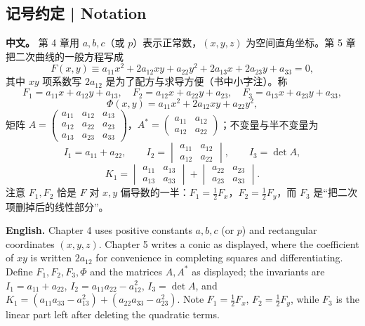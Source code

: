 \documentclass[UTF8,11pt,a4paper]{ctexart}
\newcommand{\APS}[2]{\par\noindent\textbf{中文。} #1\par\noindent\textbf{English.} #2\par\smallskip}
\theoremstyle{definition}
\begin{document}
\subsection*{记号约定 | Notation}
\APS{第 4 章用 $a,b,c$（或 $p$）表示正常数，$(x,y,z)$ 为空间直角坐标。第 5 章把二次曲线的一般方程写成
\[
F(x,y)\equiv a_{11}x^2+2a_{12}xy+a_{22}y^2+2a_{13}x+2a_{23}y+a_{33}=0,
\]
其中 $xy$ 项系数写 $2a_{12}$ 是为了配方与求导方便（书中小字注）。称
\[
F_1=a_{11}x+a_{12}y+a_{13},\quad F_2=a_{12}x+a_{22}y+a_{23},\quad F_3=a_{13}x+a_{23}y+a_{33},
\]
\[
\Phi(x,y)=a_{11}x^2+2a_{12}xy+a_{22}y^2,
\]
矩阵 $A=\begin{pmatrix}a_{11}&a_{12}&a_{13}\\ a_{12}&a_{22}&a_{23}\\ a_{13}&a_{23}&a_{33}\end{pmatrix}$，$A^*=\begin{pmatrix}a_{11}&a_{12}\\ a_{12}&a_{22}\end{pmatrix}$；不变量与半不变量为
\[
I_1=a_{11}+a_{22},\qquad I_2={\begin{vmatrix}a_{11}&a_{12}\\ a_{12}&a_{22}\end{vmatrix}},\qquad I_3=\det A,
\]
\[
K_1={\begin{vmatrix}a_{11}&a_{13}\\ a_{13}&a_{33}\end{vmatrix}}+{\begin{vmatrix}a_{22}&a_{23}\\ a_{23}&a_{33}\end{vmatrix}}.
\]
注意 $F_1,F_2$ 恰是 $F$ 对 $x,y$ 偏导数的一半：$F_1=\tfrac12 F_x$，$F_2=\tfrac12 F_y$，而 $F_3$ 是``把二次项删掉后的线性部分''。}{Chapter 4 uses positive constants $a,b,c$ (or $p$) and rectangular coordinates $(x,y,z)$. Chapter 5 writes a conic as displayed, where the coefficient of $xy$ is written $2a_{12}$ for convenience in completing squares and differentiating. Define $F_1,F_2,F_3,\Phi$ and the matrices $A,A^*$ as displayed; the invariants are $I_1=a_{11}+a_{22}$, $I_2=a_{11}a_{22}-a_{12}^2$, $I_3=\det A$, and $K_1=(a_{11}a_{33}-a_{13}^2)+(a_{22}a_{33}-a_{23}^2)$. Note $F_1=\tfrac12F_x$, $F_2=\tfrac12F_y$, while $F_3$ is the linear part left after deleting the quadratic terms.}
\end{document}
